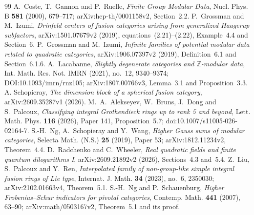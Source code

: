 \documentclass[11pt,reqno]{amsart}
\theoremstyle{definition}
\theoremstyle{remark}
\begin{document}
\begin{thebibliography}{99}
 A.~Coste, T.~Gannon and P.~Ruelle, \emph{Finite Group Modular Data}, Nucl. Phys. B \textbf{581} (2000), 679--717; arXiv:hep-th/0001158v2, Section~2.2.
 P.~Grossman and M.~Izumi, \emph{Drinfeld centers of fusion categories arising from generalized Haagerup subfactors}, arXiv:1501.07679v2 (2019), equations~(2.21)--(2.22), Example~4.4 and Section~6.
 P.~Grossman and M.~Izumi, \emph{Infinite families of potential modular data related to quadratic categories}, arXiv:1906.07397v2 (2019), Definition~6.1 and Section~6.1.6.
 A.~Lacabanne,
\emph{Slightly degenerate categories and $\mathbb Z$-modular data},
Int. Math. Res. Not. IMRN (2021), no.~12, 9340--9374;
DOI:10.1093/imrn/rnz105; arXiv:1807.00766v3, Lemma~3.1 and Proposition~3.3.
 A. Schopieray, \emph{The dimension block of a spherical fusion category}, arXiv:2609.35287v1 (2026).
 M.~A.~Alekseyev, W.~Bruns, J.~Dong and S.~Palcoux, \emph{Classifying integral Grothendieck rings up to rank 5 and beyond}, Lett. Math. Phys. \textbf{116} (2026), Paper 141, Proposition~5.7; doi:10.1007/s11005-026-02164-7.
 S.-H.~Ng, A.~Schopieray and Y.~Wang, \emph{Higher Gauss sums of modular categories}, Selecta Math. (N.S.) \textbf{25} (2019), Paper 53; arXiv:1812.11234v2, Theorem~4.4.
 D.~Radchenko and C.~Wheeler, \emph{Real quadratic fields and finite quantum dilogarithms I}, arXiv:2609.21892v2 (2026), Sections~4.3 and~5.4.
 Z.~Liu, S.~Palcoux and Y.~Ren, \emph{Interpolated family of non-group-like simple integral fusion rings of Lie type}, Internat. J. Math. \textbf{34} (2023), no.~6, 2350030; arXiv:2102.01663v4, Theorem~5.1.
 S.-H.~Ng and P.~Schauenburg, \emph{Higher Frobenius--Schur indicators for pivotal categories}, Contemp. Math. \textbf{441} (2007), 63--90; arXiv:math/0503167v2, Theorem~5.1 and its proof.
\end{thebibliography}
\end{document}
